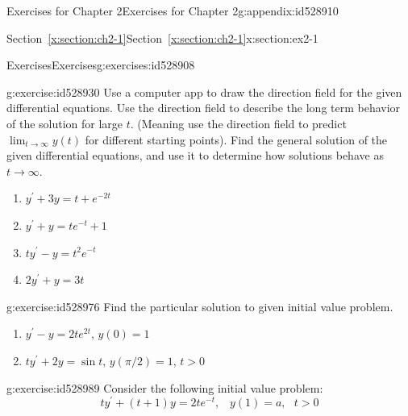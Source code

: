 \documentclass[oneside,10pt,]{book}
\newcommand{\xreffont}{\relax}
\numberwithin{equation}{section}
\numberwithin{equation}{section}
\begin{document}
\begin{appendixptx}{Exercises for Chapter 2}{}{Exercises for Chapter 2}{}{}{g:appendix:id528910}
%
%
\typeout{************************************************}
\typeout{Section C.1 Section~{\xreffont\ref*{x:section:ch2-1}}}
\typeout{************************************************}
%
\begin{sectionptx}{Section~{\xreffont\ref*{x:section:ch2-1}}}{}{Section~{\xreffont\ref*{x:section:ch2-1}}}{}{}{x:section:ex2-1}
%
%
\typeout{************************************************}
\typeout{************************************************}
%
\begin{exercises-subsection-numberless}{Exercises}{}{Exercises}{}{}{g:exercises:id528908}
\begin{divisionexercise}{1}{}{}{g:exercise:id528930}%
Use a computer app to draw the direction field for the given differential equations. Use the direction field to describe the long term behavior of the solution for large \(t\). (Meaning use the direction field to predict \(\lim_{t\to\infty}y(t)\) for different starting points). Find the general solution of the given differential equations, and use it to determine how solutions behave as \(t\to\infty\).%
%
\begin{enumerate}[label=(\alph*)]
\item{}\(\displaystyle y^{\prime}+3y=t+e^{-2t}\)%
\item{}\(\displaystyle y^{\prime}+y=te^{-t}+1\)%
\item{}\(\displaystyle ty^{\prime}-y=t^{2}e^{-t}\)%
\item{}\(\displaystyle 2y^{\prime}+y=3t\)%
\end{enumerate}
\end{divisionexercise}%
\begin{divisionexercise}{2}{}{}{g:exercise:id528976}%
Find the particular solution to given initial value problem.%
%
\begin{enumerate}[label=(\alph*)]
\item{}\(y^{\prime}-y=2te^{2t}\), \(y(0)=1\)%
\item{}\(ty^{\prime}+2y=\sin t\), \(y\left(\pi/2\right)=1\), \(t>0\)%
\end{enumerate}
\end{divisionexercise}%
\begin{divisionexercise}{3}{}{}{g:exercise:id528989}%
Consider the following initial value problem:%
\begin{equation*}
ty^{\prime}+\left(t+1\right)y=2te^{-t},\,\,\,\,\,y(1)=a,\,\,\,\,t>0

\end{equation*}
\end{divisionexercise}
\end{exercises-subsection-numberless}
\end{sectionptx}
\end{appendixptx}
\end{document}
